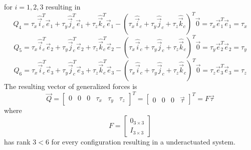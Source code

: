 for $i = 1, 2, 3$ resulting in
\[
Q_4 = \tau_{x} \hat{\vec{i}}_c^{T} \vec{e}_1 +
\tau_{y} \hat{\vec{j}}_c^{T} \vec{e}_1 + 
\tau_{z} \hat{\vec{k}}_c^{T} \vec{e}_1 -
( \tau_{x} \hat{\vec{i}}_c  +
\tau_{y} \hat{\vec{j}}_c  +
\tau_{z} \hat{\vec{k}}_c )^{T} \vec{0} = \tau_{x} \vec{e}_{1}^{T} \vec{e}_1
= \tau_{x}
\]
\[
Q_5 = \tau_{x} \hat{\vec{i}}_c^{T} \vec{e}_2 +
\tau_{y} \hat{\vec{j}}_c^{T} \vec{e}_2 + 
\tau_{z} \hat{\vec{k}}_c^{T} \vec{e}_2 -
( \tau_{x} \hat{\vec{i}}_c  +
\tau_{y} \hat{\vec{j}}_c  +
\tau_{z} \hat{\vec{k}}_c )^{T} \vec{0} = \tau_{y} \vec{e}_{2}^{T} \vec{e}_2
= \tau_{y}
\]
\[
Q_6 = \tau_{x} \hat{\vec{i}}_c^{T} \vec{e}_3 +
\tau_{y} \hat{\vec{j}}_c^{T} \vec{e}_3 + 
\tau_{z} \hat{\vec{k}}_c^{T} \vec{e}_3 -
( \tau_{x} \hat{\vec{i}}_c  +
\tau_{y} \hat{\vec{j}}_c  +
\tau_{z} \hat{\vec{k}}_c )^{T} \vec{0} = \tau_{z} \vec{e}_{3}^{T} \vec{e}_3
= \tau_{z}
\]
The resulting vector of generalized forces is
\[
\vec{Q} =
\begin{bmatrix}
  0 & 0 & 0 & \tau_x & \tau_y & \tau_z
\end{bmatrix}^{T} = 
\begin{bmatrix}
  0 & 0 & 0 & \vec{\tau}
\end{bmatrix}^{T}
= F \vec{\tau}
\]
where
\[
F =
\begin{bmatrix}
  0_{3\times3} \\
  I_{3\times3}
\end{bmatrix}
\]
has rank $3 < 6$ for every configuration resulting in a underactuated system.

